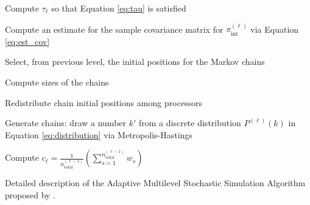 \begin{algorithm}[!htb]
{ Compute $\tau_\ell$ so that Equation \eqref{eq:tau} is satisfied\;
 
 Compute an estimate for the sample covariance matrix for $\pi_\text{int}^{(\ell)}$ via Equation \eqref{eq:est_cov}\;
 
  
 Select, from previous level, the initial positions for the Markov chains\;  

 Compute sizes of the chains          
 
 Redistribute chain initial positions among processors\; 
 

 Generate chains: draw a number $k'$ from a discrete distribution $P^{(\ell)}(k)$ in Equation \eqref{eq:distribution} via Metropolis-Hastings 
 
 Compute $c_{\ell} =\frac{1}{ n_\text{total}^{(\ell-1)}}  \left( \sum_{s=1}^{n_\text{total}^{(\ell-1)}} w_{s} \right)$ 
 
 }
\caption{Detailed description of the  Adaptive Multilevel Stochastic Simulation Algorithm proposed by \cite{CheungPrudencio2012}.}\label{alg:ML}
\end{algorithm}




%  
%  
%  
 

